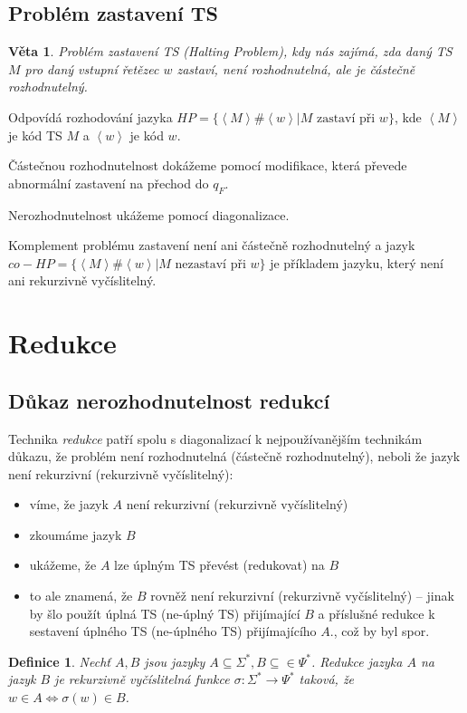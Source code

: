 \documentclass[a4paper, 11pt]{report}
\newtheorem{mydef}{Definice}[chapter]
\newtheorem{veta}{Věta}[chapter]
\begin{document}
\subsection{Problém zastavení TS}

\begin{veta}
Problém zastavení TS (Halting Problem), kdy nás zajímá, zda daný TS $M$ pro daný vstupní řetězec $w$ zastaví, není rozhodnutelná, ale je částečně rozhodnutelný.
\end{veta}
Odpovídá rozhodování jazyka $HP = \{\left<M\right>\#\left<w\right> | M \text{ zastaví při } w\}$, kde $\left<M\right>$ je kód TS $M$ a $\left<w\right>$ je kód $w$.

Částečnou rozhodnutelnost dokážeme pomocí modifikace, která převede abnormální zastavení na přechod do $q_F$.

Nerozhodnutelnost ukážeme pomocí diagonalizace.

Komplement problému zastavení není ani částečně rozhodnutelný a jazyk $co-HP = \{\left<M\right>\#\left<w\right> | M \text{ nezastaví při } w\}$ je příkladem jazyku, který není ani rekurzivně vyčíslitelný.

\section{Redukce}
\subsection{Důkaz nerozhodnutelnost redukcí}
Technika \emph{redukce} patří spolu s diagonalizací k nejpoužívanějším technikám důkazu, že problém není rozhodnutelná (částečně rozhodnutelný), neboli že jazyk není rekurzivní (rekurzivně vyčíslitelný):
\begin{itemize}
	\item víme, že jazyk $A$ není rekurzivní (rekurzivně vyčíslitelný)
	\item zkoumáme jazyk $B$
	\item ukážeme, že $A$ lze úplným TS převést (redukovat) na $B$
	\item to ale znamená, že $B$ rovněž není rekurzivní (rekurzivně vyčíslitelný) -- jinak by šlo použít úplná TS (ne-úplný TS) přijímající $B$ a příslušné redukce k sestavení úplného TS (ne-úplného TS) přijímajícího $A$., což by byl spor.
\end{itemize}

\begin{mydef}
Nechť $A, B$ jsou jazyky $A \subseteq \Sigma^*, B \subseteq \in \Psi^*$. Redukce jazyka $A$ na jazyk $B$ je rekurzivně vyčíslitelná funkce $\sigma: \Sigma^* \to \Psi^*$ taková, že $w \in A \Leftrightarrow \sigma(w) \in B$.
\end{mydef}
\end{document}
